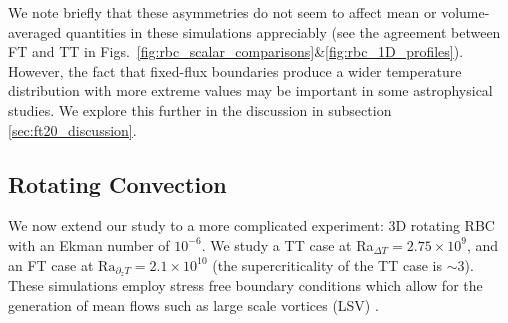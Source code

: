 We note briefly that these asymmetries do not seem to affect mean or volume-averaged quantities in these simulations appreciably (see the agreement between FT and TT in Figs.~\ref{fig:rbc_scalar_comparisons}\&\ref{fig:rbc_1D_profiles}).
However, the fact that fixed-flux boundaries produce a wider temperature distribution with more extreme values may be important in some astrophysical studies.
We explore this further in the discussion in subsection \ref{sec:ft20_discussion}.





\subsection{Rotating \RB Convection}
\label{sec:ft20_rotating_results}

We now extend our study to a more complicated experiment: 3D rotating RBC with an Ekman number of $10^{-6}$.
We study a TT case at Ra$_{\Delta T} = 2.75\times 10^9$, and an FT case at $\text{Ra}_{\partial_z T} = 2.1 \times 10^{10}$ (the supercriticality of the TT case is $\sim 3$).
These simulations employ stress free boundary conditions which allow for the generation of mean flows such as large scale vortices (LSV) \citep{stellmach&all2014, rubio&all2014, guervilly&all2014, guervilly&hughes2017, favier&all2014, favier&all2019, couston&all2019}.

